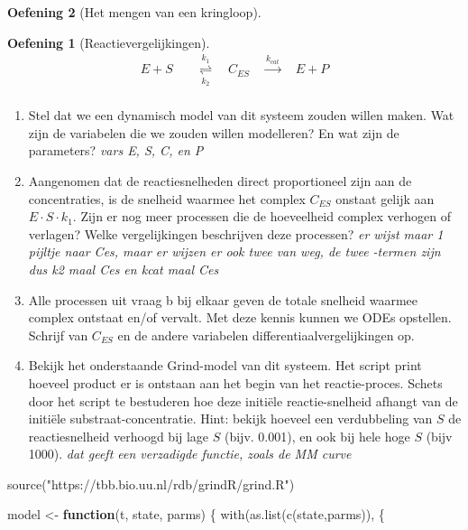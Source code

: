 \documentclass[
  a4paper,
]{scrbook}
\newenvironment{Shaded}{\begin{snugshade}}{\end{snugshade}}
\newcommand{\ControlFlowTok}[1]{\textcolor[rgb]{0.00,0.23,0.31}{\textbf{#1}}}
\newcommand{\FunctionTok}[1]{\textcolor[rgb]{0.28,0.35,0.67}{#1}}
\newcommand{\NormalTok}[1]{\textcolor[rgb]{0.00,0.23,0.31}{#1}}
\newcommand{\OtherTok}[1]{\textcolor[rgb]{0.00,0.23,0.31}{#1}}
\newcommand{\StringTok}[1]{\textcolor[rgb]{0.13,0.47,0.30}{#1}}
\providecommand{\tightlist}{%
  \setlength{\itemsep}{0pt}\setlength{\parskip}{0pt}}\usepackage{longtable,booktabs,array}
\theoremstyle{definition}
\newtheorem{exercise}{Oefening}[chapter]
\theoremstyle{remark}
\begin{document}
\begin{exercise}[Het mengen van een
kringloop]
\begin{exercise}[Reactievergelijkingen]
\begin{align}
    E+S & \quad \underset{k_2}{\stackrel{k_1}{\rightleftharpoons}} \quad C_{ES} \quad \xrightarrow{k_{cat}} \quad E+P\\
\end{align}

\begin{enumerate}
\def\labelenumi{\alph{enumi}.}
\tightlist
\item
  Stel dat we een dynamisch model van dit systeem zouden willen maken.
  Wat zijn de variabelen die we zouden willen modelleren? En wat zijn de
  parameters? \emph{vars E, S, C, en P}
\item
  Aangenomen dat de reactiesnelheden direct proportioneel zijn aan de
  concentraties, is de snelheid waarmee het complex \(C_{ES}\) onstaat
  gelijk aan \(E \cdot S \cdot k_1\). Zijn er nog meer processen die de
  hoeveelheid complex verhogen of verlagen? Welke vergelijkingen
  beschrijven deze processen? \emph{er wijst maar 1 pijltje naar Ces,
  maar er wijzen er ook twee van weg, de twee -termen zijn dus k2 maal
  Ces en kcat maal Ces}
\item
  Alle processen uit vraag b bij elkaar geven de totale snelheid waarmee
  complex ontstaat en/of vervalt. Met deze kennis kunnen we ODEs
  opstellen. Schrijf van \(C_{ES}\) en de andere variabelen
  differentiaalvergelijkingen op.
\item
  Bekijk het onderstaande Grind-model van dit systeem. Het script print
  hoeveel product er is ontstaan aan het begin van het reactie-proces.
  Schets door het script te bestuderen hoe deze initiële
  reactie-snelheid afhangt van de initiële substraat-concentratie. Hint:
  bekijk hoeveel een verdubbeling van \(S\) de reactiesnelheid verhoogd
  bij lage \(S\) (bijv. 0.001), en ook bij hele hoge \(S\) (bijv 1000).
  \emph{dat geeft een verzadigde functie, zoals de MM curve}
\end{enumerate}

\begin{Shaded}
\begin{Highlighting}[]
\FunctionTok{source}\NormalTok{(}\StringTok{"https://tbb.bio.uu.nl/rdb/grindR/grind.R"}\NormalTok{)}

\NormalTok{model }\OtherTok{\textless{}{-}} \ControlFlowTok{function}\NormalTok{(t, state, parms) \{}
  \FunctionTok{with}\NormalTok{(}\FunctionTok{as.list}\NormalTok{(}\FunctionTok{c}\NormalTok{(state,parms)), \{ }
    

\end{Highlighting}
\end{Shaded}
\end{exercise}
\end{exercise}
\end{document}
